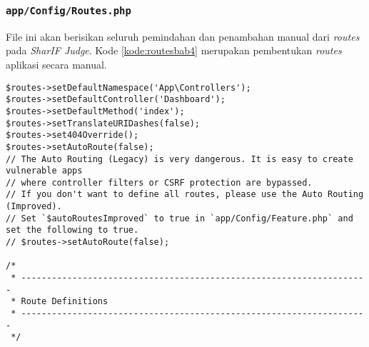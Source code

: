 \subsubsection{\texttt{app/Config/Routes.php}}
File ini akan berisikan seluruh pemindahan dan penambahan manual dari \textit{routes} pada \textit{SharIF Judge}. Kode \ref{kode:routesbab4} merupakan pembentukan \textit{routes} aplikasi secara manual.
\begin{lstlisting}[caption=Penambahan \textit{routes} yang digunakan pada aplikasi \textit{SharIF Judge}, label=kode:routesbab4]
	$routes->setDefaultNamespace('App\Controllers');
$routes->setDefaultController('Dashboard');
$routes->setDefaultMethod('index');
$routes->setTranslateURIDashes(false);
$routes->set404Override();
$routes->setAutoRoute(false);
// The Auto Routing (Legacy) is very dangerous. It is easy to create vulnerable apps
// where controller filters or CSRF protection are bypassed.
// If you don't want to define all routes, please use the Auto Routing (Improved).
// Set `$autoRoutesImproved` to true in `app/Config/Feature.php` and set the following to true.
// $routes->setAutoRoute(false);

/*
 * --------------------------------------------------------------------
 * Route Definitions
 * --------------------------------------------------------------------
 */


\end{lstlisting}
